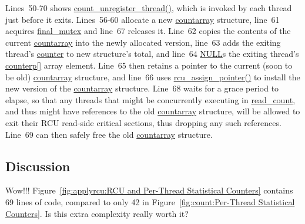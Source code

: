 Lines~50-70 shows \url{count_unregister_thread()}, which is invoked
by each thread just before it exits.
Lines~56-60 allocate a new \url{countarray} structure,
line~61 acquires \url{final_mutex} and line~67 releases it.
Line~62 copies the contents of the current \url{countarray} into
the newly allocated version, line~63 adds the exiting thread's \url{counter}
to new structure's total, and line~64 \url{NULL}s the exiting thread's
\url{counterp[]} array element.
Line~65 then retains a pointer to the current (soon to be old)
\url{countarray} structure, and line~66 uses \url{rcu_assign_pointer()}
to install the new version of the \url{countarray} structure.
Line~68 waits for a grace period to elapse, so that any threads that
might be concurrently executing in \url{read_count}, and thus might
have references to the old \url{countarray} structure, will be allowed
to exit their RCU read-side critical sections, thus dropping any such
references.
Line~69 can then safely free the old \url{countarray} structure.

\subsection{Discussion}

\QuickQuiz{}
	Wow!!!
	Figure~\ref{fig:applyrcu:RCU and Per-Thread Statistical Counters}
	contains 69 lines of code, compared to only 42 in
	Figure~\ref{fig:count:Per-Thread Statistical Counters}.
	Is this extra complexity really worth it?
 \QuickQuizEnd

